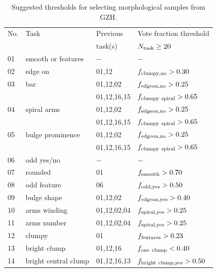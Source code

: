 \documentclass[twocolumn]{aastex6}
\begin{document}
\begin{table}
\caption{Suggested thresholds for selecting morphological samples from GZH. \label{tbl:thresholds}}
\begin{tabular}{llll}
\hline\hline
No.      &  Task 	            & Previous         & Vote fraction threshold            \\
         &            	        & task(s)          & $N_{\rm task} \ge 20$              \\
\hline
01       & smooth or features   & $-$              & $-$                                \\
02       & edge on              & 01,12            & $f_{\rm clumpy,no}>0.30$           \\
03       & bar		            & 01,12,02         & $f_{\rm edgeon,no}>0.25$           \\
         &                      & 01,12,16,15      & $f_{\rm clumpy~spiral}>0.65$       \\
04       & spiral arms          & 01,12,02         & $f_{\rm edgeon,no}>0.25$           \\
         &                      & 01,12,16,15      & $f_{\rm clumpy~spiral}>0.65$       \\
05       & bulge prominence     & 01,12,02         & $f_{\rm edgeon,no}>0.25$           \\
         &                      & 01,12,16,15      & $f_{\rm clumpy~spiral}>0.65$       \\
06       & odd yes/no           & $-$              & $-$                                \\
07       & rounded              & 01               & $f_{\rm smooth}>0.70$              \\
08       & odd feature          & 06               & $f_{\rm odd,yes}> 0.50$            \\
09       & bulge shape          & 01,12,02         & $f_{\rm edgeon,yes}>0.40$          \\
10       & arms winding         & 01,12,02,04      & $f_{\rm spiral,yes}>0.25$          \\
11       & arms number          & 01,12,02,04      & $f_{\rm spiral,yes}>0.25$          \\
12       & clumpy               & 01               & $f_{\rm features}>0.23$            \\
13       & bright clump         & 01,12,16         & $f_{\rm one~clump}< 0.40$          \\
14       & bright central clump & 01,12,16,13      & $f_{\rm bright~clump,yes}>0.50$    \\

\end{tabular}
\end{table}
\end{document}
